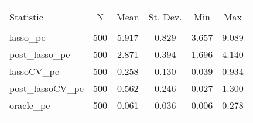 
\begin{table}[!htbp] \centering 
  \caption{} 
  \label{} 
\begin{tabular}{@{\extracolsep{5pt}}lccccc} 
\\[-1.8ex]\hline 
\hline \\[-1.8ex] 
Statistic & \multicolumn{1}{c}{N} & \multicolumn{1}{c}{Mean} & \multicolumn{1}{c}{St. Dev.} & \multicolumn{1}{c}{Min} & \multicolumn{1}{c}{Max} \\ 
\hline \\[-1.8ex] 
lasso\_pe & 500 & 5.917 & 0.829 & 3.657 & 9.089 \\ 
post\_lasso\_pe & 500 & 2.871 & 0.394 & 1.696 & 4.140 \\ 
lassoCV\_pe & 500 & 0.258 & 0.130 & 0.039 & 0.934 \\ 
post\_lassoCV\_pe & 500 & 0.562 & 0.246 & 0.027 & 1.300 \\ 
oracle\_pe & 500 & 0.061 & 0.036 & 0.006 & 0.278 \\ 
\hline \\[-1.8ex] 
\end{tabular} 
\end{table} 
